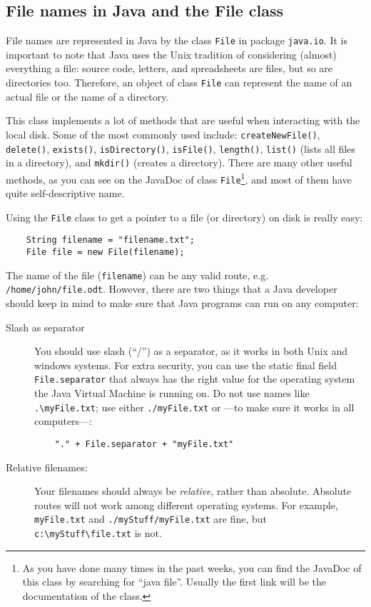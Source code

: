 \subsection{File names in Java and the File class}
\label{sec:files-java}

File names are represented in Java by the class \verb+File+ in package
\verb+java.io+. It is important to note that Java uses the Unix
tradition of considering (almost) everything a file: source code,
letters, and 
spreadsheets are files, but so are directories too. Therefore,
an object of class \verb+File+ can represent the name of an actual
file or the name of a directory.

This class implements a lot of methods that are useful when
interacting with the local disk. Some of the most commonly used
include: 
\verb+createNewFile()+, 
\verb+delete()+, 
\verb+exists()+, 
\verb+isDirectory()+, 
\verb+isFile()+, 
\verb+length()+, 
\verb+list()+ (lists all files in a directory), 
and
\verb+mkdir()+ (creates a directory). There are many other useful
methods, as you can see on the JavaDoc of class \verb+File+\footnote{As you
  have done many times in the past weeks, you can find the JavaDoc of
  this class by searching for ``java file''. Usually the first link
  will be the documentation of the class. }, and most of them have
quite self-descriptive name. 

Using the \verb+File+ class to get a pointer to a file (or directory)
on disk is really easy: 

\begin{verbatim}
    String filename = "filename.txt"; 
    File file = new File(filename);
\end{verbatim}

The name of the file (\verb+filename+) can be any valid route,
e.g. \verb+/home/john/file.odt+. However, there are two things that a
Java developer should keep in mind to make sure that Java programs can
run on any computer: 

\begin{description}
\item[Slash as separator] You should use slash (``/'') as a separator,
  as it works in both Unix and windows systems. For extra security,
  you can use the static final field \verb+File.separator+ that always
  has the right value for the operating system the Java Virtual
  Machine is running on. Do not use names like \verb+.\myFile.txt+;
  use either \verb+./myFile.txt+ or ---to make sure it works in all
  computers---:

\begin{verbatim}
    "." + File.separator + "myFile.txt"
\end{verbatim}

\item[Relative filenames: ] Your filenames should always be
  \emph{relative}, rather than absolute. Absolute routes will not work
  among different operating systems. For example, \verb+myFile.txt+ and
  \verb+./myStuff/myFile.txt+ are fine, but \verb+c:\myStuff\file.txt+
  is not. 
\end{description}

